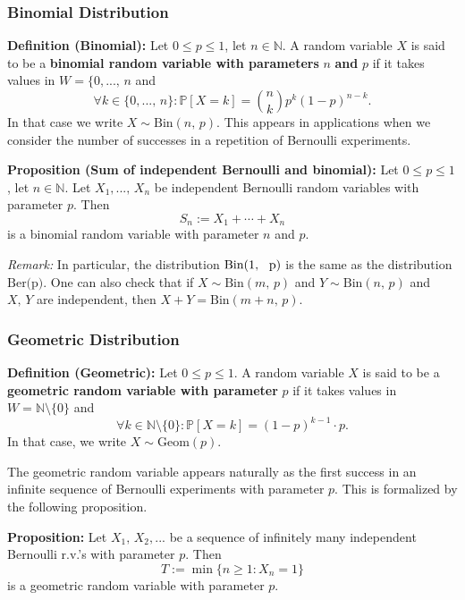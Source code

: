 \documentclass[a4paper]{extarticle}
\begin{document}
\subsubsection{Binomial Distribution}

\textbf{Definition (Binomial):} Let \(0 \leq p \leq 1\), let \(n \in \mathbb{N}\). A random variable \(X\) is said to be a \textbf{binomial random variable with parameters} \(n\) \textbf{and} \(p\) if it takes values in \(W = \{0,..., \, n\) and
\[
    \forall k \in \{0,..., \, n\} : \mathbb{P}[X = k] = \binom{n}{k} p^k (1 - p)^{n - k}.
\]
In that case we write \(X \sim \text{Bin}(n, \, p)\). This appears in applications when we consider the number of successes in a repetition of Bernoulli experiments.

\begin{cbox}
    \textbf{Proposition (Sum of independent Bernoulli and binomial):} Let \(0 \leq p \leq 1\), let \(n \in \mathbb{N}\). Let \(X_1,..., \, X_n\) be independent Bernoulli random variables with parameter \(p\). Then
    \[
        S_n := X_1 + \cdots + X_n
    \]
    is a binomial random variable with parameter \(n\) and \(p\).
\end{cbox}

\textit{Remark:} In particular, the distribution \(\text{Bin(1, \, p)}\) is the same as the distribution \(\text{Ber(p)}\). One can also check that if \(X \sim \text{Bin}(m, \, p)\) and \(Y \sim \text{Bin}(n, \, p)\) and \(X, \, Y\) are independent, then \(X + Y = \text{Bin}(m + n, \, p)\).

\subsubsection{Geometric Distribution}

\textbf{Definition (Geometric):} Let \(0 \leq p \leq 1\). A random variable \(X\) is said to be a \textbf{geometric random variable with parameter} \(p\) if it takes values in \(W = \mathbb{N} \setminus \{0\}\) and
\[
    \forall k \in \mathbb{N} \setminus \{0\} : \mathbb{P}[X = k] = (1 - p)^{k - 1} \cdot p.
\]
In that case, we write \(X \sim \text{Geom}(p)\).

The geometric random variable appears naturally as the first success in an infinite sequence of Bernoulli experiments with parameter \(p\). This is formalized by the following proposition.

\begin{cbox}
    \textbf{Proposition:} Let \(X_1, \, X_2,...\) be a sequence of infinitely many independent Bernoulli r.v.'s with parameter \(p\). Then
    \[
        T := \min \{n \geq 1 : X_n = 1\}
    \]
    is a geometric random variable with parameter \(p\).
\end{cbox}
\end{document}
